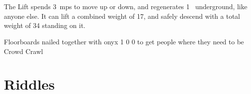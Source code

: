 \printindex[talismans]

\section{}

\begin{multicols}{2}

\noindent
The Lift spends 3~\glspl{mp} to move up or down, and regenerates 1~ underground, like anyone else.
It can lift a combined \gls{weight} of 17, and safely descend with a total \gls{weight} of 34 standing on it.%

\columnbreak

  {Floorboards nailed together with onyx}%
  {1}%
  {0}%
  {0}%
  {to get people where they need to be}%
  {Crowd Crawl}%
  {
    \setcounter{Fire}{3}
    \setcounter{Earth}{3}
    \setcounter{Air}{1}
    \setcounter{Water}{1}
    \setcounter{Academics}{2}
  }%

\end{multicols}

\newpage
\section{Riddles}
\label{riddles}

